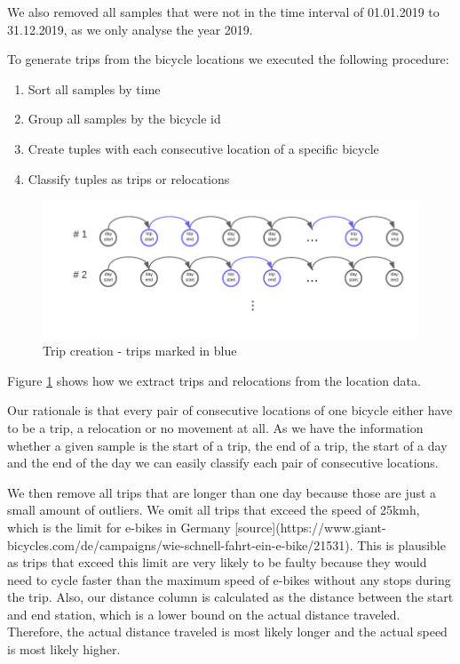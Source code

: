 We also removed all samples that were not in the time interval of 01.01.2019 to 31.12.2019, as we only analyse the year 2019.

To generate trips from the bicycle locations we executed the following procedure:
\begin{enumerate}
  \item Sort all samples by time
  \item Group all samples by the bicycle id
  \item Create tuples with each consecutive location of a specific bicycle
  \item Classify tuples as trips or relocations 
\end{enumerate}


\begin{figure}[htp]
    \centering
    \includegraphics{Figures/trip_creation_diagram.pdf}
    \caption{Trip creation - trips marked in blue}
    \label{fig:trip_creation}
\end{figure}

Figure \ref{fig:trip_creation} shows how we extract trips and relocations from the location data.

Our rationale is that every pair of consecutive locations of one bicycle either have to be a trip, a relocation or no movement at all.
As we have the information whether a given sample is the start of a trip, the end of a trip, the start of a day and the end of the day we can easily classify each pair of consecutive locations.


We then remove all trips that are longer than one day because those are just a small amount of outliers. 
We omit all trips that exceed the speed of 25kmh, which is the limit for e-bikes in Germany [source](https://www.giant-bicycles.com/de/campaigns/wie-schnell-fahrt-ein-e-bike/21531). 
This is plausible as trips that exceed this limit are very likely to be faulty because they would need to cycle faster than the maximum speed of e-bikes without any stops during the trip. 
Also, our distance column is calculated as the distance between the start and end station, which is a lower bound on the actual distance traveled. 
Therefore, the actual distance traveled is most likely longer and the actual speed is most likely higher.


